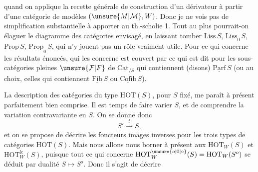  quand on applique la recette générale de construction d'un dérivateur à partir d'une catégorie de modèles $(\unsure{M|\mathcal M},W)$. Donc je ne vois pas de simplification substantielle à apporter au th.-scholie 1. Tout au plus pourrait-on élaguer le diagramme des catégories envisagé, en laissant tomber $\underline{\mathrm{Liss}}\,S$, $\underline{\mathrm{Liss}}_0\,S$, $\underline{\mathrm{Prop}}\,S$, $\underline{\mathrm{Prop}}_0\,S$, qui n'y jouent pas un rôle vraiment utile.
Pour ce qui concerne les résultats énoncés,  qui les concerne est couvert par ce qui est dit pour les sous-catégories pleines $\unsure{\mathcal F|F}$ de $\mathrm{Cat}_{/S}$ qui contiennent (disons) $\underline{\mathrm{Parf}}\,S$ (ou au choix, celles qui contiennent $\underline{\mathrm{Fib}}\,S$ ou $\underline{\mathrm{Cofib}}\,S$).


La description des catégories du type $\mathrm{HOT}(S)$, pour $S$ fixé, me paraît à présent parfaitement bien comprise. Il est temps de faire varier $S$, et de comprendre la variation contravariante en $S$. On se donne donc
\[
S'\xrightarrow{t}S,
\]
et on se propose de décrire les foncteurs images inverses pour les trois types de catégories $\mathrm{HOT}(S)$. Mais nous allons nous borner à présent aux $\mathrm{HOT}_W(S)$ et $\mathrm{HOT}^{\mathrm{lc}}_W(S)$, puisque tout ce qui concerne $\mathrm{HOT}^{\unsure{o|0|\circ}}_W(S)=\mathrm{HOT}_W(S^o)$  se déduit par dualité $S\longmapsto S^o$. Donc il s'agit de décrire
